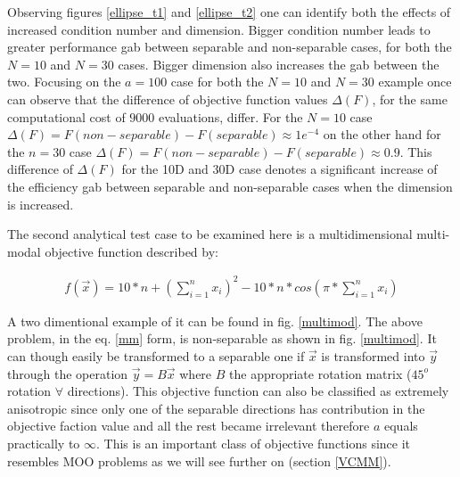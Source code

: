 Observing figures \ref{ellipse_t1} and \ref{ellipse_t2} one can identify both the effects of increased condition number and dimension. Bigger condition number leads to greater performance gab between separable and non-separable cases, for both the $N=10$ and $N=30$ cases. Bigger dimension also increases the gab between the two. Focusing on the $a=100$ case for both the $N=10$ and $N=30$ example once can observe that the difference of objective function values $\Delta(F)$, for the same computational cost of $9000$ evaluations, differ. For the $N=10$ case $\Delta(F)=F(non-separable)-F(separable) \approx  1e^{-4}$ on the other hand for the $n=30$ case $\Delta(F)=F(non-separable)-F(separable) \approx  0.9$. This difference of $\Delta(F)$ for the 10D and 30D case denotes a significant increase of the efficiency gab between separable and non-separable cases when the dimension is increased.      

The second analytical test case to be examined here is a multidimensional multi-modal objective function described by:  

\begin{eqnarray}
   f(\vec{x})=10*n+(\sum^{n}_{i=1}x_i)^2 - 10*n*cos(\pi * \sum^{n}_{i=1}x_i)
   \label{mm} 
\end{eqnarray}

A two dimentional example of it can be found in fig. \ref{multimod}. The above problem, in the eq. \ref{mm} form, is non-separable as shown in fig. \ref{multimod}. It can though easily be transformed to a separable one if $\vec{x}$ is transformed into $\vec{y}$ through the operation $\vec{y}=B\vec{x}$ where $B$ the appropriate rotation matrix ($45^o$ rotation $\forall$ directions).  This objective function can also be classified as extremely anisotropic since only one of the separable directions has contribution in the objective faction value and all the rest became irrelevant therefore $a$ equals practically to $\infty$. This is an important class of objective functions since it resembles MOO problems as we will see further on (section \ref{VCMM}).    

